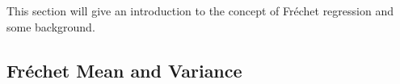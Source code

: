 This section will give an introduction to the concept of Fréchet regression
and some background.

\subsection{Fréchet Mean and Variance}
\label{sec:fr mean and variance}
